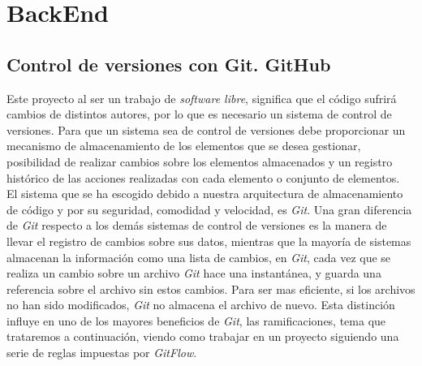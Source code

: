 \documentclass[a4paper, 12pt]{book}
\begin{document}
\section{BackEnd}
\label{sec:backend}
\subsection{Control de versiones con Git. GitHub}
\label{subsec:git}
\begin{figure}[h]
    \centering
     \hspace{30mm}
\end{figure}
Este proyecto al ser un trabajo de \emph{software libre}, significa que el código sufrirá cambios de distintos autores, por lo que es necesario un sistema de control de versiones. Para que un sistema sea de control de versiones debe proporcionar un mecanismo de almacenamiento de los elementos que se desea gestionar, posibilidad de realizar cambios sobre los elementos almacenados y un registro histórico de las acciones realizadas con cada elemento o conjunto de elementos. \\
El sistema que se ha escogido debido a nuestra arquitectura de almacenamiento de código y por su seguridad, comodidad y velocidad, es \emph{Git}. Una gran diferencia de \emph{Git} respecto a los demás sistemas de control de versiones es la manera de llevar el registro de cambios sobre sus datos, mientras que la mayoría de sistemas almacenan la información como una lista de cambios, en \emph{Git}, cada vez que se realiza un cambio sobre un archivo \emph{Git} hace una instantánea, y guarda una referencia sobre el archivo sin estos cambios. Para ser mas eficiente, si los archivos no han sido modificados, \emph{Git} no almacena el archivo de nuevo. Esta distinción influye en uno de los mayores beneficios de \emph{Git}, las ramificaciones, tema que trataremos a continuación, viendo como trabajar en un proyecto siguiendo una serie de reglas impuestas por \emph{GitFlow}. \\
\end{document}
